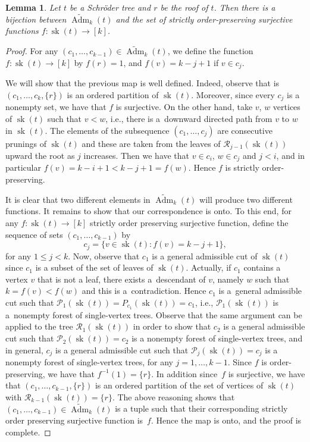 \documentclass[11pt]{article}
\numberwithin{equation}{section}
\numberwithin{equation}{section}
\newtheorem{Lemma}[Theorem]{Lemma}
\newcommand{\cR}{\mathcal{R}}
\newcommand{\ccP}{\mathcal{P}}
\newcommand{\sk}{\operatorname{sk}}
\newcommand{\AdmT}{\widetilde{\operatorname{Adm}}}
\begin{document}
\begin{Lemma}\label{lemma:bijection}Let $t$ be a Schr\"oder tree and $r$ be the roof of $t$. Then there is a bijection between $\AdmT_k(t)$ and the set of strictly order-preserving surjective functions $f\colon \sk(t)\to [k]$.
\end{Lemma}
\begin{proof}For any $(c_1,\dots,c_{k-1})\in \AdmT_k(t)$, we define the function $f\colon \sk(t)\to[k]$ by $f(r) = 1$, and $f(v) = k - j+1$ if $v\in c_{j}$.

We will show that the previous map is well defined. Indeed, observe that is $(c_1,\dots,c_k,\{r\})$ is an ordered partition of $\sk(t)$. Moreover, since every $c_j$ is a nonempty set, we have that $f$ is surjective. On the other hand, take $v$, $w$ vertices of $\sk(t)$ such that $v<w$, i.e., there is a~downward directed path from $v$ to $w$ in $\sk(t)$. The elements of the subsequence $(c_1,\dots,c_j)$ are consecutive prunings of $\sk(t)$ and these are taken from the leaves of $\cR_{j-1}(\sk(t))$ upward the root as $j$ increases. Then we have that $v\in c_i$, $w\in c_j$ and $j<i$, and in particular $f(v) = k-i+1 < k-j+1 = f(w)$. Hence $f$ is strictly order-preserving.

 It is clear that two different elements in $\AdmT_k(t)$ will produce two different functions. It remains to show that our correspondence is onto. To this end, for any $f\colon \sk(t)\to[k]$ strictly order preserving surjective function, define the sequence of sets $(c_1,\dots,c_{k-1})$ by
 \[
 c_j = \{ v\in \sk(t)\colon f(v) = k-j+1\},
 \]
 for any $1\leq j<k$. Now, observe that $c_1$ is a general admissible cut of $\sk(t)$ since $c_1$ is a subset of the set of leaves of $\sk(t)$. Actually, if $c_1$ contains a vertex $v$ that is not a leaf, there exists a~descendant of $v$, namely $w$ such that $k = f(v) < f(w)$ and this is a~contradiction. Hence $c_1$ is a~general admissible cut such that $\ccP_1(\sk(t)) = P_{c_1}(\sk(t)) = c_1$, i.e., $\ccP_{1}(\sk(t))$ is a~nonempty forest of single-vertex trees. Observe that the same argument can be applied to the tree $\cR_1(\sk(t))$ in order to show that $c_2$ is a general admissible cut such that $\ccP_{2}(\sk(t)) = c_2$ is a nonempty forest of single-vertex trees, and in general, $c_j$ is a general admissible cut such that $\ccP_j(\sk(t))= c_j$ is a nonempty forest of single-vertex trees, for any $j=1,\dots,k-1$. Since $f$ is order-preserving, we have that $f^{-1}(1) = \{r\}$. In addition since~$f$ is surjective, we have that $(c_1,\dots,c_{k-1},\{r\})$ is an ordered partition of the set of vertices of $\sk(t)$ with $\cR_{k-1}(\sk(t)) = \{r\}$. The above reasoning shows that $(c_1,\dots,c_{k-1})\in \AdmT_k(t)$ is a tuple such that their corresponding strictly order preserving surjective function is~$f$. Hence the map is onto, and the proof is complete.
\end{proof}
\end{document}
